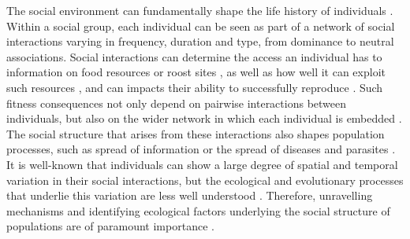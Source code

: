 \documentclass[10pt, twoside]{book} %
\begin{document}
The social environment can fundamentally shape the life history of individuals \citep{Krause2002}. Within a social group, each individual can be seen as part of a network of social interactions varying in frequency, duration and type, from dominance to neutral associations. Social interactions can determine the access an individual has to information on food resources or roost sites \citep{Fortuna2009, Aplin2012, Webster2013}, as well as how well it can exploit such resources \citep{Firth2016}, and can impacts their ability to successfully reproduce \citep{Oh2010}. Such fitness consequences not only depend on pairwise interactions between individuals, but also on the wider network in which each individual is embedded \citep{Brent2015}. The social structure that arises from these interactions also shapes population processes, such as spread of information or the spread of diseases and parasites \citep{Bull2012, MacIntosh2012}. It is well-known that individuals can show a large degree of spatial and temporal variation in their social interactions, but the ecological and evolutionary processes that underlie this variation are less well understood \citep{Sih2009, Farine2015, Croft2016}. Therefore, unravelling mechanisms and identifying ecological factors underlying the social structure of populations are of paramount importance \citep{Wey2008, Farine2015}.\\
\end{document}

